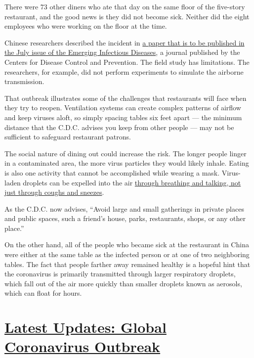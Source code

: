 There were 73 other diners who ate that day on the same floor of the
five-story restaurant, and the good news is they did not become sick.
Neither did the eight employees who were working on the floor at the
time.

Chinese researchers described the incident in
\href{https://wwwnc.cdc.gov/eid/article/26/7/20-0764_article\#comment}{a
paper that is to be published in the July issue of the Emerging
Infectious Diseases}, a journal published by the Centers for Disease
Control and Prevention. The field study has limitations. The
researchers, for example, did not perform experiments to simulate the
airborne transmission.

That outbreak illustrates some of the challenges that restaurants will
face when they try to reopen. Ventilation systems can create complex
patterns of airflow and keep viruses aloft, so simply spacing tables six
feet apart --- the minimum distance that the C.D.C. advises you keep
from other people --- may not be sufficient to safeguard restaurant
patrons.

The social nature of dining out could increase the risk. The longer
people linger in a contaminated area, the more virus particles they
would likely inhale. Eating is also one activity that cannot be
accomplished while wearing a mask. Virus-laden droplets can be expelled
into the air
\href{https://www.nytimes.com/interactive/2020/04/14/science/coronavirus-transmission-cough-6-feet-ar-ul.html}{through
breathing and talking, not just through coughs and sneezes}.

As the C.D.C. now advises, ``Avoid large and small gatherings in private
places and public spaces, such a friend's house, parks, restaurants,
shops, or any other place.''

On the other hand, all of the people who became sick at the restaurant
in China were either at the same table as the infected person or at one
of two neighboring tables. The fact that people farther away remained
healthy is a hopeful hint that the coronavirus is primarily transmitted
through larger respiratory droplets, which fall out of the air more
quickly than smaller droplets known as aerosols, which can float for
hours.

\hypertarget{latest-updates-global-coronavirus-outbreak}{%
\section{\texorpdfstring{\href{https://www.nytimes.com/2020/08/01/world/coronavirus-covid-19.html?action=click\&pgtype=Article\&state=default\&region=MAIN_CONTENT_1\&context=storylines_live_updates}{Latest
Updates: Global Coronavirus
Outbreak}}{Latest Updates: Global Coronavirus Outbreak}}\label{latest-updates-global-coronavirus-outbreak}}

